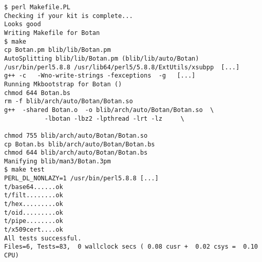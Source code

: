 \documentclass{article}
\begin{document}
\begin{verbatim}
$ perl Makefile.PL
Checking if your kit is complete...
Looks good
Writing Makefile for Botan
$ make
cp Botan.pm blib/lib/Botan.pm
AutoSplitting blib/lib/Botan.pm (blib/lib/auto/Botan)
/usr/bin/perl5.8.8 /usr/lib64/perl5/5.8.8/ExtUtils/xsubpp  [...]
g++ -c   -Wno-write-strings -fexceptions  -g   [...]
Running Mkbootstrap for Botan ()
chmod 644 Botan.bs
rm -f blib/arch/auto/Botan/Botan.so
g++  -shared Botan.o  -o blib/arch/auto/Botan/Botan.so  \
           -lbotan -lbz2 -lpthread -lrt -lz     \

chmod 755 blib/arch/auto/Botan/Botan.so
cp Botan.bs blib/arch/auto/Botan/Botan.bs
chmod 644 blib/arch/auto/Botan/Botan.bs
Manifying blib/man3/Botan.3pm
$ make test
PERL_DL_NONLAZY=1 /usr/bin/perl5.8.8 [...]
t/base64......ok
t/filt........ok
t/hex.........ok
t/oid.........ok
t/pipe........ok
t/x509cert....ok
All tests successful.
Files=6, Tests=83,  0 wallclock secs ( 0.08 cusr +  0.02 csys =  0.10 CPU)
\end{verbatim}
\end{document}

